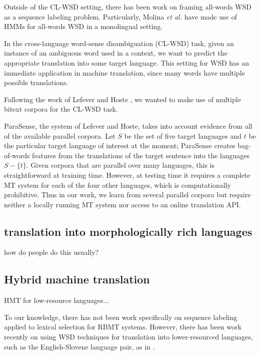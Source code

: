 Outside of the CL-WSD setting, there has been work on framing all-words WSD as
a sequence labeling problem. Particularly, Molina \textit{et al.}
 have made use of HMMs for all-words
WSD in a monolingual setting.



In the cross-language word-sense disambiguation (CL-WSD) task, given an
instance of an ambiguous word used in a context, we want to predict the
appropriate translation into some target language. This setting for WSD has an
immediate application in machine translation, since many words have multiple
possible translations.


Following the work of Lefever and Hoste
, we wanted to make use of
multiple bitext corpora for the CL-WSD task.

ParaSense, the system of Lefever
and Hoste, takes into account evidence from all of the available parallel
corpora. Let $S$ be the set of five target languages and $t$ be the particular
target language of interest at the moment; ParaSense creates bag-of-words
features from the translations of the target sentence into the languages $S -
\lbrace{t \rbrace}$.
Given corpora that are parallel over many languages, this is straightforward at
training time. However, at testing time it requires a complete MT system for
each of the four other languages, which is computationally prohibitive. Thus in
our work, we learn from several parallel corpora but require neither a locally
running MT system nor access to an online translation API.



\subsection{translation into morphologically rich languages}

how do people do this usually?


\subsection{Hybrid machine translation}
HMT for low-resource languages...

To our knowledge, there has not been work specifically on sequence labeling
applied to lexical selection for RBMT systems. However, 
there has been work recently on using WSD techniques for translation into
lower-resourced languages, such as the English-Slovene language pair, as in 
\cite{vintar-fivser-vrvsvcaj:2012:ESIRMT-HyTra2012}. 


